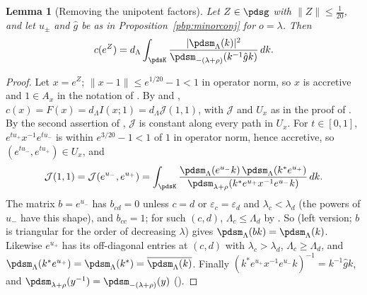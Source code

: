 \documentclass[10pt]{amsart}
\newtheorem{lemma}[theorem]{Lemma}
\theoremstyle{definition}
\theoremstyle{remark}
\providecommand{\aubar}[1]{\overline{#1}}
\begin{document}
\begin{lemma}[Removing the unipotent factors]\label{pbp:reduced}
Let $Z\in\pdsg$ with $\|Z\|\le\frac1{20}$, and let $u_\pm$ and $\hat g$ be as in
Proposition~\ref{pbp:minorconj} for $o=\lambda$. Then
\[
c(e^Z)=d_\Lambda\int_{\pdsK}\frac{|\pdsm_\Lambda(k)|^2}{\pdsm_{-(\lambda+\rho)}(k^{-1}\hat gk)}\,dk .
\]
\end{lemma}
\begin{proof}
Let $x=e^Z$; $\|x-1\|\le e^{1/20}-1<1$ in operator norm, so $x$ is accretive and $1\in A_x$ in the
notation of {\cite[\S3.2.4]{P49}}. By {\cite[Theorem~3.17]{P49}} and {\cite[Proposition~3.21]{P49}}, $c(x)=
F(x)=d_\Lambda I(x;1)=d_\Lambda\mathcal J(1,1)$, with $\mathcal J$ and $U_x$ as in the proof of
{\cite[Proposition~3.21]{P49}}. By the second assertion of {\cite[Proposition~3.21]{P49}}, $\mathcal J$
is constant along every path in $U_x$. For $t\in[0,1]$,
$e^{tu_+}x^{-1}e^{tu_-}$ is within $e^{3/20}-1<1$ of $1$ in operator norm, hence accretive, so $(e^{tu_-},
e^{tu_+})\in U_x$, and
\[
\mathcal J(1,1)=\mathcal J(e^{u_-},e^{u_+})=\int_{\pdsK}\frac{\pdsm_\Lambda(e^{u_-}k)\,\pdsm_\Lambda(k^*
e^{u_+})}{\pdsm_{\lambda+\rho}(k^*e^{u_+}x^{-1}e^{u_-}k)}\,dk .
\]
The matrix $b=e^{u_-}$ has $b_{cd}=0$ unless $c=d$ or $\varepsilon_c=\varepsilon_d$ and $\lambda_c<
\lambda_d$ (the powers of $u_-$ have this shape), and $b_{cc}=1$; for such $(c,d)$, $\Lambda_c\le
\Lambda_d$ by {\cite[Lemma~3.18(c)]{P49}}. So {\cite[Lemma~3.18(b)]{P49}} (left version; $b$ is triangular
for the order of decreasing $\lambda$) gives $\pdsm_\Lambda(bk)=\pdsm_\Lambda(k)$. Likewise $e^{u_+}$
has its off-diagonal entries at $(c,d)$ with $\lambda_c>\lambda_d$, $\Lambda_c\ge\Lambda_d$, and
$\pdsm_\Lambda(k^*e^{u_+})=\pdsm_\Lambda(k^*)=\aubar{\pdsm_\Lambda(k)}$. Finally
$(k^*e^{u_+}x^{-1}e^{u_-}k)^{-1}=k^{-1}\hat gk$, and $\pdsm_{\lambda+\rho}(y^{-1})=\pdsm_{-(\lambda+\rho)}
(y)$ ({\cite[Lemma~3.18(a)]{P49}}).
\end{proof}
\end{document}
